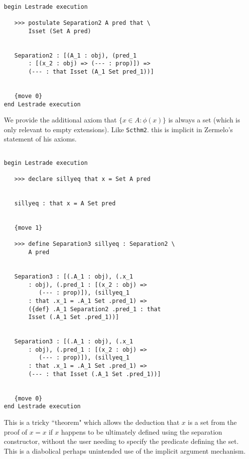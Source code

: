 \documentclass[12pt]{article}
\begin{document}
\begin{verbatim}

begin Lestrade execution

   >>> postulate Separation2 A pred that \
       Isset (Set A pred)


   Separation2 : [(A_1 : obj), (pred_1 
       : [(x_2 : obj) => (--- : prop)]) => 
       (--- : that Isset (A_1 Set pred_1))]


   {move 0}
end Lestrade execution
\end{verbatim}

We provide the additional axiom that $\{x \in A:\phi(x)\}$ is always a set (which is only relevant to empty extensions).  Like {\tt Scthm2}. this is implicit in Zermelo's statement of his axioms.

\begin{verbatim}

begin Lestrade execution

   >>> declare sillyeq that x = Set A pred


   sillyeq : that x = A Set pred


   {move 1}

   >>> define Separation3 sillyeq : Separation2 \
       A pred


   Separation3 : [(.A_1 : obj), (.x_1 
       : obj), (.pred_1 : [(x_2 : obj) => 
          (--- : prop)]), (sillyeq_1 
       : that .x_1 = .A_1 Set .pred_1) => 
       ({def} .A_1 Separation2 .pred_1 : that 
       Isset (.A_1 Set .pred_1))]


   Separation3 : [(.A_1 : obj), (.x_1 
       : obj), (.pred_1 : [(x_2 : obj) => 
          (--- : prop)]), (sillyeq_1 
       : that .x_1 = .A_1 Set .pred_1) => 
       (--- : that Isset (.A_1 Set .pred_1))]


   {move 0}
end Lestrade execution
\end{verbatim}

This is a tricky ``theorem" which allows the deduction that $x$ is a set from the proof of $x=x$ if $x$ happens to be ultimately defined using the separation constructor, without the user needing to specify the predicate defining the set.  This is a diabolical perhaps unintended use of the implicit argument mechanism.
\end{document}
